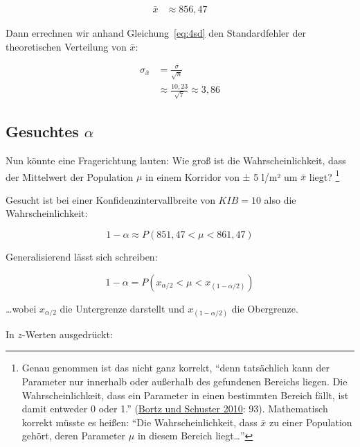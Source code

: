 \documentclass[
  11pt,
  ngerman,
  a4paper,
]{report}
\begin{document}
\nopagebreak

\[
\begin{aligned}
  \bar{x}&\approx856{,}47
\end{aligned}
\]

Dann errechnen wir anhand Gleichung~\eqref{eq:4sd} den Standardfehler der theoretischen Verteilung von \(\bar{x}\):

\nopagebreak

\[\begin{aligned}
\sigma_{\bar{x}}&=\frac{\sigma}{\sqrt{n}}\\[4pt]
           &\approx\frac{10{,}23}{\sqrt{7}}\approx3,86
\end{aligned}\]

\hypertarget{gesuchtes-alpha}{%
\subsection{\texorpdfstring{Gesuchtes \(\alpha\)}{Gesuchtes \textbackslash alpha}}\label{gesuchtes-alpha}}

Nun könnte eine Fragerichtung lauten: Wie groß ist die Wahrscheinlichkeit, dass der Mittelwert der Population \(\mu\) in einem Korridor von ± 5 l/m² um \(\bar{x}\) liegt? \footnote{Genau genommen ist das nicht ganz korrekt, \enquote{denn tatsächlich kann der Parameter nur innerhalb oder außerhalb des gefundenen Bereichs liegen. Die Wahrscheinlichkeit, dass ein Parameter in einen bestimmten Bereich fällt, ist damit entweder 0 oder 1.} (\protect\hyperlink{ref-bortz}{Bortz und Schuster 2010}: 93). Mathematisch korrekt müsste es heißen: \enquote{Die Wahrscheinlichkeit, dass \(\bar{x}\) zu einer Population gehört, deren Parameter \(\mu\) in diesem Bereich liegt\ldots{}}}

Gesucht ist bei einer Konfidenzintervallbreite von \(\textit{KIB}=10\) also die Wahrscheinlichkeit:

\nopagebreak

\[1-\alpha\approx P(851{,}47 < \mu < 861{,}47)\]

Generalisierend lässt sich schreiben:

\nopagebreak

\[
1-\alpha=P(x_{\alpha/2} < \mu < x_{(1-\alpha/2)})
\]

\nopagebreak

\ldots wobei \(x_{\alpha/2}\) die Untergrenze darstellt und \(x_{(1-\alpha/2)}\) die Obergrenze.

In \(z\)-Werten ausgedrückt:

\nopagebreak
\end{document}
